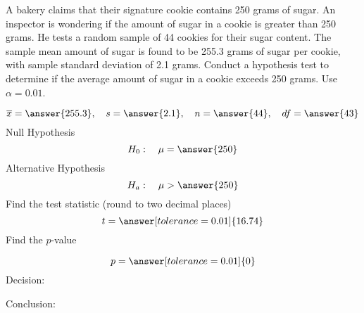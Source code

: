 \documentclass{ximera}
\begin{document}
 
 \begin{problem}\label{prob:140hom9prob2}
A bakery claims that their signature cookie contains 250 grams of sugar.  An inspector is wondering if the amount of sugar in a cookie is greater than 250 grams.  He tests a random sample of 44 cookies for their sugar content.  The sample mean amount of sugar is found to be 255.3 grams of sugar per cookie, with sample standard deviation of 2.1 grams.  Conduct a hypothesis test to determine if the average amount of sugar in a cookie exceeds 250 grams.  Use $\alpha=0.01$.

$$\overline{x}=\answer{255.3},\quad s=\answer{2.1},\quad n=\answer{44},\quad df=\answer{43}$$
Null Hypothesis
$$H_0:\quad \mu=\answer{250}$$
Alternative Hypothesis
$$H_a:\quad \mu>\answer{250}$$
Find the test statistic (round to two decimal places)
$$t=\answer[tolerance=0.01]{16.74}$$
Find the $p$-value
\begin{center}  
\end{center}
$$p=\answer[tolerance=0.01]{0}$$
Decision:

\begin{multipleChoice} 
\end{multipleChoice}  

Conclusion:

\begin{multipleChoice} 
\end{multipleChoice} 
\end{problem}
\end{document}
